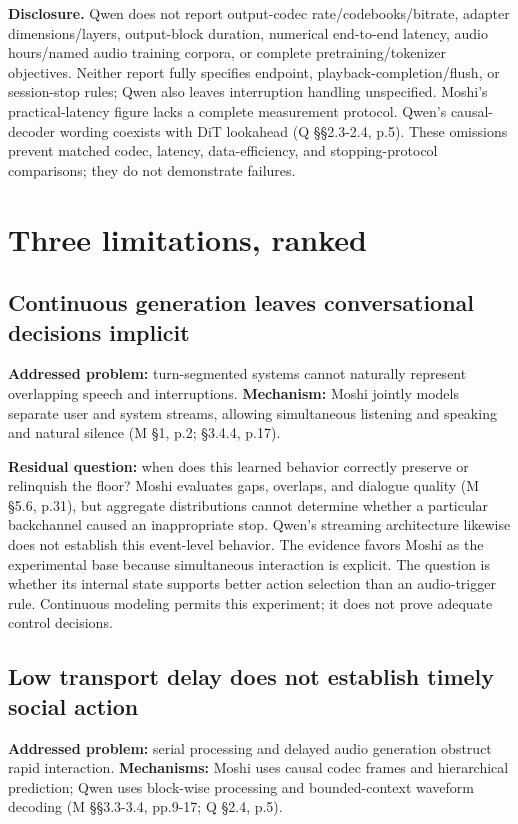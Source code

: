 \documentclass[11pt]{article}
\begin{document}
\textbf{Disclosure.} Qwen does not report output-codec rate/codebooks/bitrate, adapter dimensions/layers, output-block duration, numerical end-to-end latency, audio hours/named audio training corpora, or complete pretraining/tokenizer objectives. Neither report fully specifies endpoint, playback-completion/flush, or session-stop rules; Qwen also leaves interruption handling unspecified. Moshi's practical-latency figure lacks a complete measurement protocol. Qwen's causal-decoder wording coexists with DiT lookahead (Q §§2.3-2.4, p.5). These omissions prevent matched codec, latency, data-efficiency, and stopping-protocol comparisons; they do not demonstrate failures.

\newpage
\section{Three limitations, ranked}

\subsection{Continuous generation leaves conversational decisions implicit}

\textbf{Addressed problem:} turn-segmented systems cannot naturally represent overlapping speech and interruptions. \textbf{Mechanism:} Moshi jointly models separate user and system streams, allowing simultaneous listening and speaking and natural silence (M §1, p.2; §3.4.4, p.17).

\textbf{Residual question:} when does this learned behavior correctly preserve or relinquish the floor? Moshi evaluates gaps, overlaps, and dialogue quality (M §5.6, p.31), but aggregate distributions cannot determine whether a particular backchannel caused an inappropriate stop. Qwen's streaming architecture likewise does not establish this event-level behavior. The evidence favors Moshi as the experimental base because simultaneous interaction is explicit. The question is whether its internal state supports better action selection than an audio-trigger rule. Continuous modeling permits this experiment; it does not prove adequate control decisions.

\subsection{Low transport delay does not establish timely social action}

\textbf{Addressed problem:} serial processing and delayed audio generation obstruct rapid interaction. \textbf{Mechanisms:} Moshi uses causal codec frames and hierarchical prediction; Qwen uses block-wise processing and bounded-context waveform decoding (M §§3.3-3.4, pp.9-17; Q §2.4, p.5).
\end{document}
